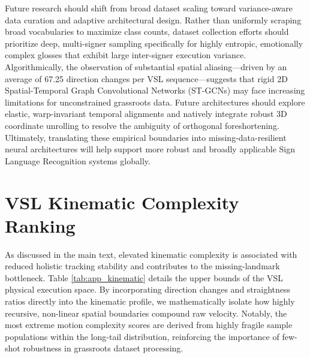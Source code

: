 \documentclass{ieeeaccess}
\begin{document}
Future research should shift from broad dataset scaling toward variance-aware data curation and adaptive architectural design. Rather than uniformly scraping broad vocabularies to maximize class counts, dataset collection efforts should prioritize deep, multi-signer sampling specifically for highly entropic, emotionally complex glosses that exhibit large inter-signer execution variance. Algorithmically, the observation of substantial spatial aliasing—driven by an average of 67.25 direction changes per VSL sequence—suggests that rigid 2D Spatial-Temporal Graph Convolutional Networks (ST-GCNs) may face increasing limitations for unconstrained grassroots data. Future architectures should explore elastic, warp-invariant temporal alignments and natively integrate robust 3D coordinate unrolling to resolve the ambiguity of orthogonal foreshortening. Ultimately, translating these empirical boundaries into missing-data-resilient neural architectures will help support more robust and broadly applicable Sign Language Recognition systems globally.

\FloatBarrier
\clearpage
\appendices

\section{VSL Kinematic Complexity Ranking}
As discussed in the main text, elevated kinematic complexity is associated with reduced holistic tracking stability and contributes to the missing-landmark bottleneck. Table \ref{tab:app_kinematic} details the upper bounds of the VSL physical execution space. By incorporating direction changes and straightness ratios directly into the kinematic profile, we mathematically isolate how highly recursive, non-linear spatial boundaries compound raw velocity. Notably, the most extreme motion complexity scores are derived from highly fragile sample populations within the long-tail distribution, reinforcing the importance of few-shot robustness in grassroots dataset processing.
\end{document}
